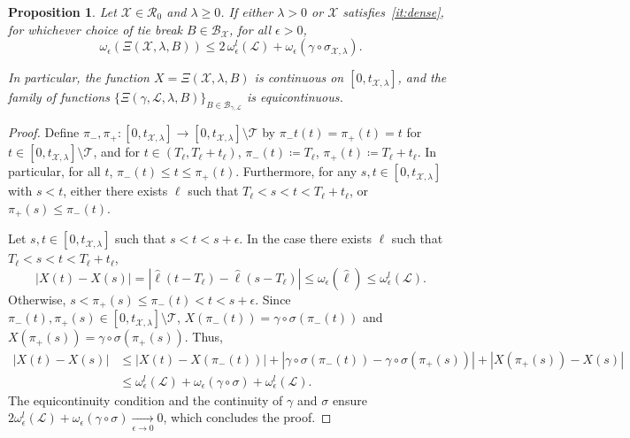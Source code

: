 \documentclass[11pt]{article}
\newtheorem{proposition}[theorem]{Proposition}
\def\cX{{\mathcal X}}
\def\Conf{{\mathscr{R}}}
\def\Att{{\Xi}}
\begin{document}
\begin{proposition}
  \label{prop:extension}
  Let $\mathcal{X}\in \Conf_0$ and $\lambda\geq 0$.
  If either $\lambda>0$ or $\mathcal{X}$  satisfies~\eqref{it:dense}, for whichever choice of tie break $B\in \mathcal{B}_{\mathcal{X}}$, for all $\epsilon>0$,
  \[ \omega_\epsilon(\Att(\mathcal{X},\lambda,B))\leq 2\, \omega^l_\epsilon(\mathcal{L})+
  \omega_\epsilon(\gamma\circ \sigma_{\cX,\lambda}).\]

  In particular, the function $X=\Att(\mathcal{X},\lambda,B)$ is continuous on $[0,t_{\mathcal{X},\lambda}]$,
  and the family of functions $\{\Att(\gamma,\mathcal{L},\lambda,B)\}_{B\in \mathcal{B}_{\gamma,\mathcal{L}}}$ is equicontinuous.
\end{proposition}
\begin{proof}
  Define $\pi_-,\pi_+:[0,t_{\mathcal{X},\lambda}]\to [0,t_{\mathcal{X},\lambda}]\setminus \mathcal{T}$ by $\pi_-t(t)=\pi_+(t)=t$ for $t\in [0,t_{\mathcal{X},\lambda} ]\setminus \mathcal{T}$, and for $t\in(T_\ell,T_\ell+t_\ell)$, $\pi_-(t)\coloneqq T_\ell$, $\pi_+(t)\coloneqq T_\ell+t_\ell$.
  In particular, for all $t$, $\pi_-(t)\leq t \leq \pi_+(t)$. Furthermore, for any $s,t\in [0,t_{\mathcal{X},\lambda}]$ with $s<t$, either there exists $\ell$ such that
  $T_\ell<s<t< T_\ell+t_\ell$, or $\pi_+(s)\leq \pi_-(t)$.

  Let $s,t \in [0,t_{\mathcal{X},\lambda}]$ such that $s<t<s+\epsilon$. In the case there exists $\ell$ such that $T_\ell<s<t< T_\ell+t_\ell$,
  \[ |X(t)-X(s)|=|\hat{\ell}(t-T_\ell)-\hat{\ell}(s-T_\ell)|\leq \omega_\epsilon(\hat{\ell})\leq \omega^l_\epsilon(\mathcal{L}).\]
  Otherwise, $s<\pi_+(s)\leq \pi_-(t)<t<s+\epsilon$. Since $\pi_-(t),\pi_+(s)\in  [0,t_{\mathcal{X},\lambda}]\setminus \mathcal{T}   $,
  $X( \pi_-(t))=\gamma\circ \sigma (\pi_-(t))$ and  $X( \pi_+(s))=\gamma\circ \sigma (\pi_+(s))$. Thus,
  \begin{align*}
  |X(t)-X(s)|&\leq |X(t)-X( \pi_-(t))|+|\gamma\circ \sigma( \pi_-(t))-\gamma\circ \sigma(\pi_+(s))|+|X(\pi_+(s))-X(s)|\\
  &\leq \omega^l_\epsilon(\mathcal{L})+
  \omega_\epsilon(\gamma\circ \sigma)+  \omega^l_\epsilon(\mathcal{L}).
  \end{align*}
  The equicontinuity condition and the continuity of $\gamma$ and $\sigma$ ensure $2 \omega^l_\epsilon(\mathcal{L})+
  \omega_\epsilon(\gamma\circ \sigma)\underset{\epsilon\to 0}\longrightarrow 0$,
  which concludes the proof.
\end{proof}
\end{document}
